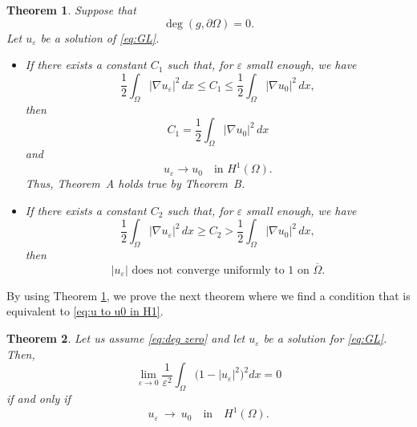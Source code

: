 \documentclass[a4paper,10pt,reqno]{amsart}
\newtheorem{theorem}{Theorem}[section]
\theoremstyle{definition}
\newcommand{\ve}{{\varepsilon}}
\newcommand{\Om}{{\Omega}}
\newcommand{\qin}{{\quad \mbox{in} \quad}}
\numberwithin{equation}{section}
\begin{document}
\smallskip
\begin{theorem}\label{thm:main1}
Suppose that
\begin{equation}\label{eq:deg zero}
\deg (g,\partial \Omega)=0.
\end{equation}
Let $u_\ve$ be a solution of \eqref{eq:GL}.
\begin{itemize}
\item[{\rm (i)}]
If there exists a constant $C_1$ such that, for $\ve$ small enough, we have
\begin{equation}\label{G < C_1}
\frac{1}{2} \int_\Omega |\nabla u_\ve|^2 \, dx \leq C_1 \leq
\frac{1}{2} \int_\Omega |\nabla u_0|^2 \, dx,
\end{equation}
then
\begin{equation}\label{eq:C1-1}
C_1 = \frac{1}{2} \int_\Omega |\nabla u_0|^2 \, dx
\end{equation}
and
\[
u_\ve \to u_0 \quad \text{in } H^1(\Omega).
\]
Thus, Theorem~A holds true by Theorem~B.

\item[{\rm (ii)}]
If there exists a constant $C_2$ such that, for $\ve$ small enough, we have
\begin{equation}\label{G bdd by C1-C2}
\frac{1}{2} \int_\Omega |\nabla u_\ve|^2 \, dx \geq C_2 > \frac{1}{2} \int_\Omega |\nabla u_0|^2 \, dx,
\end{equation}
then
\begin{equation}\label{no-uniform-convergence-2}
|u_{\ve}| \text{ does not converge uniformly to } 1 \text{ on } \overline{\Omega}.
\end{equation}
\end{itemize}

\end{theorem}
\medskip

By using Theorem \ref{thm:main1}, we prove the next theorem where
 we find a condition that is equivalent to \eqref{eq:u to u0 in H1}.

\medskip
\begin{theorem}\label{thm:main2}
Let us assume \eqref{eq:deg zero} and let  $u_\ve$ be a solution for  \eqref{eq:GL}.
Then,
\begin{equation}\label{eq:potential to zero}
\lim_{\ve \to 0} \frac{1}{\ve^2} \int_\Om  \big( 1- |u_\ve|^2 \big)^2 dx=0
\end{equation}
if and only if
\begin{equation}\label{eq:lim nabla u}
   u_\ve  ~\to ~   u_0 \qin H^1(\Om).
\end{equation}
\end{theorem}
\bigskip
\end{document}

